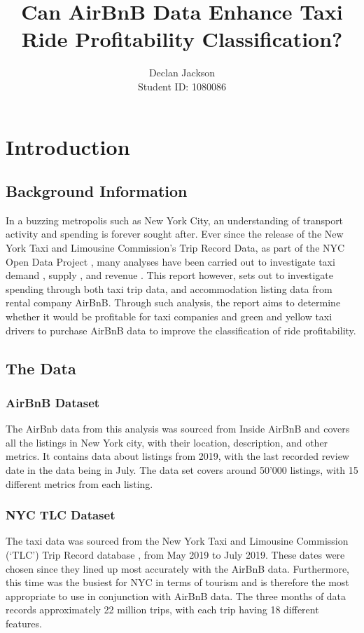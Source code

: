 \documentclass[11pt]{article}
\title{\textbf{Can AirBnB Data Enhance Taxi Ride Profitability Classification?}}
\author{Declan Jackson \\
        Student ID: 1080086}
\begin{document}
\maketitle

\section{Introduction}
\subsection{Background Information}
In a buzzing metropolis such as New York City, an understanding of transport activity and spending is forever sought after. Ever since the release of the New York Taxi and Limousine Commission’s Trip Record Data, as part of the NYC Open Data Project \cite{open_data_website}, many analyses have been carried out to investigate taxi demand \cite{taxi_demand}, supply \cite{taxi_supply}, and revenue \cite{taxi_revenue}. This report however, sets out to investigate spending through both taxi trip data, and accommodation listing data from rental company AirBnB. Through such analysis, the report aims to determine whether it would be profitable for taxi companies and green and yellow taxi drivers to purchase AirBnB data to improve the classification of ride profitability. 

\subsection{The Data}
\subsubsection{AirBnB Dataset}
The AirBnb data from this analysis was sourced from Inside AirBnB \cite{airbnb_data} and covers all the listings in New York city, with their location, description, and other metrics. It contains data about listings from 2019, with the last recorded review date in the data being in July. The data set covers around 50’000 listings, with 15 different metrics from each listing.

\subsubsection{NYC TLC Dataset}
The taxi data was sourced from the New York Taxi and Limousine Commission (‘TLC’) Trip Record database \cite{taxi_data}, from May 2019 to July 2019. These dates were chosen since they lined up most accurately with the AirBnB data. Furthermore, this time was the busiest for NYC in terms of tourism \cite{tourism_data}and is therefore the most appropriate to use in conjunction with AirBnB data. The three months of data records approximately 22 million trips, with each trip having 18 different features.
\end{document}
